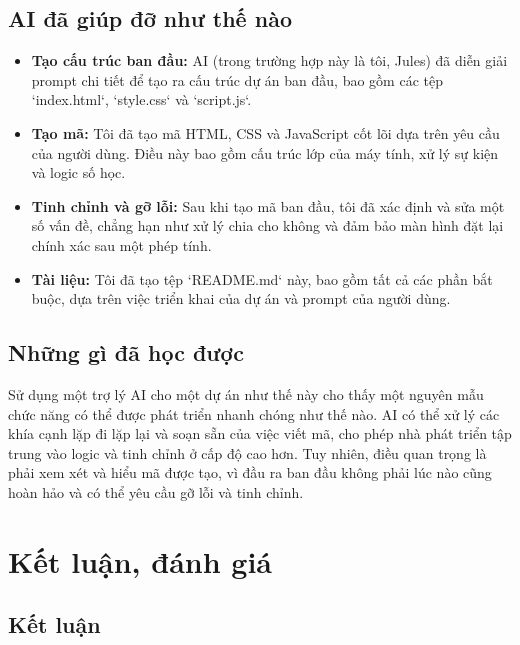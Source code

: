 \documentclass{article}
\begin{document}
\subsection{AI đã giúp đỡ như thế nào}
\begin{itemize}
    \item \textbf{Tạo cấu trúc ban đầu:} AI (trong trường hợp này là tôi, Jules) đã diễn giải prompt chi tiết để tạo ra cấu trúc dự án ban đầu, bao gồm các tệp `index.html`, `style.css` và `script.js`.
    \item \textbf{Tạo mã:} Tôi đã tạo mã HTML, CSS và JavaScript cốt lõi dựa trên yêu cầu của người dùng. Điều này bao gồm cấu trúc lớp của máy tính, xử lý sự kiện và logic số học.
    \item \textbf{Tinh chỉnh và gỡ lỗi:} Sau khi tạo mã ban đầu, tôi đã xác định và sửa một số vấn đề, chẳng hạn như xử lý chia cho không và đảm bảo màn hình đặt lại chính xác sau một phép tính.
    \item \textbf{Tài liệu:} Tôi đã tạo tệp `README.md` này, bao gồm tất cả các phần bắt buộc, dựa trên việc triển khai của dự án và prompt của người dùng.
\end{itemize}

\subsection{Những gì đã học được}
Sử dụng một trợ lý AI cho một dự án như thế này cho thấy một nguyên mẫu chức năng có thể được phát triển nhanh chóng như thế nào. AI có thể xử lý các khía cạnh lặp đi lặp lại và soạn sẵn của việc viết mã, cho phép nhà phát triển tập trung vào logic và tinh chỉnh ở cấp độ cao hơn. Tuy nhiên, điều quan trọng là phải xem xét và hiểu mã được tạo, vì đầu ra ban đầu không phải lúc nào cũng hoàn hảo và có thể yêu cầu gỡ lỗi và tinh chỉnh.

\section{Kết luận, đánh giá}

\subsection{Kết luận}
\end{document}
